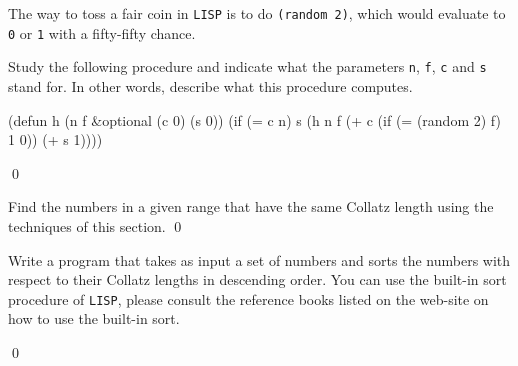 \documentclass[a4paper,11pt]{article}
\begin{document}
\begin{uexercise}
The way to toss a fair coin in \Verb+LISP+ is to do \Verb+(random 2)+, which would evaluate to \Verb+0+ or \Verb+1+ with a fifty-fifty chance.

Study the following procedure and indicate what the parameters \Verb+n+, \Verb+f+, \Verb+c+ and \Verb+s+ stand for. In other words, describe what this procedure computes.

\begin{lispcode}
(defun h (n f &optional (c 0) (s 0))
  (if (= c n)
    s
    (h n f (+ c (if (= (random 2) f) 1 0)) (+ s 1))))
\end{lispcode}

\qed
\end{uexercise}

\begin{uexercise}

Find the numbers in a given range that have the same Collatz length using the techniques of this section.
\qed
\end{uexercise}

\begin{uexercise}[*]
Write a program that takes as input a set of numbers and sorts the numbers with respect to their Collatz lengths in descending order. You can use the built-in sort procedure of \Verb+LISP+, please consult the reference books listed on the web-site on how to use the built-in sort.

\qed
\end{uexercise}


\noindent \hrulefill
\newpage
\end{document}
